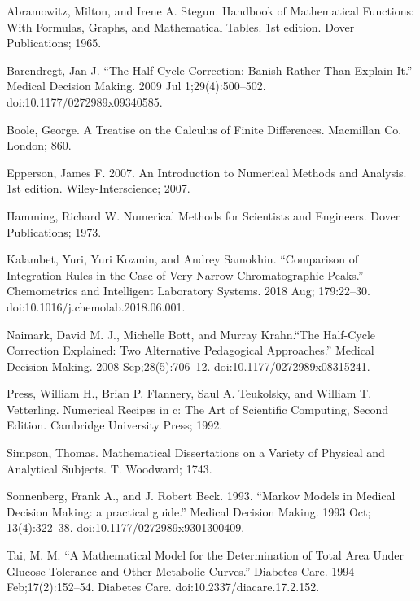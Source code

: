 \documentclass[]{article}
\begin{document}
\begin{thebibliography}{99}

Abramowitz, Milton, and Irene A. Stegun. Handbook of
Mathematical Functions: With Formulas, Graphs, and
Mathematical Tables. 1st edition. Dover Publications; 1965.

Barendregt, Jan J. ``The Half-Cycle Correction: Banish Rather Than
Explain It.'' Medical Decision Making. 2009 Jul 1;29(4):500--502.
doi:10.1177/0272989x09340585.

Boole, George. A Treatise on the Calculus of Finite
Differences. Macmillan Co. London; 860. 

Epperson, James F. 2007. An Introduction to Numerical Methods and
Analysis. 1st edition. Wiley-Interscience; 2007.

Hamming, Richard W. Numerical Methods for Scientists and
Engineers. Dover Publications; 1973.

Kalambet, Yuri, Yuri Kozmin, and Andrey Samokhin. ``Comparison of
Integration Rules in the Case of Very Narrow Chromatographic Peaks.''
Chemometrics and Intelligent Laboratory Systems. 2018 Aug; 179:22--30.
doi:10.1016/j.chemolab.2018.06.001.

Naimark, David M. J., Michelle Bott, and Murray Krahn.``The
Half-Cycle Correction Explained: Two Alternative Pedagogical
Approaches.'' Medical Decision Making. 2008 Sep;28(5):706--12.
doi:10.1177/0272989x08315241.

Press, William H., Brian P. Flannery, Saul A. Teukolsky, and William T.
Vetterling. Numerical Recipes in c: The Art of Scientific
Computing, Second Edition. Cambridge University Press; 1992.

Simpson, Thomas. Mathematical Dissertations on a Variety of
Physical and Analytical Subjects. T. Woodward; 1743.

Sonnenberg, Frank A., and J. Robert Beck. 1993. ``Markov Models in
Medical Decision Making: a practical guide.'' Medical Decision Making. 1993 Oct; 13(4):322--38.
doi:10.1177/0272989x9301300409.

Tai, M. M. ``A Mathematical Model for the Determination of Total
Area Under Glucose Tolerance and Other Metabolic Curves.''
Diabetes Care. 1994 Feb;17(2):152--54. Diabetes Care.
doi:10.2337/diacare.17.2.152.

\end{thebibliography}
\end{document}
